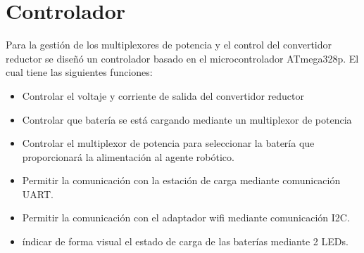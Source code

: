 \section{Controlador}

    Para la gestión de los multiplexores de potencia y el control del convertidor
    reductor se diseñó un controlador basado en el microcontrolador ATmega328p.
    El cual tiene las siguientes funciones:

    \begin{itemize}
        \item Controlar el voltaje y corriente de salida del convertidor reductor
        \item Controlar que batería se está cargando mediante un multiplexor de potencia
        \item Controlar el multiplexor de potencia para seleccionar la batería
        que proporcionará la alimentación al agente robótico.
        \item Permitir la comunicación con la estación de carga mediante comunicación
        UART.
        \item  Permitir la comunicación con el adaptador wifi mediante comunicación
        I2C.
        \item índicar de forma visual el estado de carga de las baterías mediante
        2 LEDs.
    \end{itemize}
